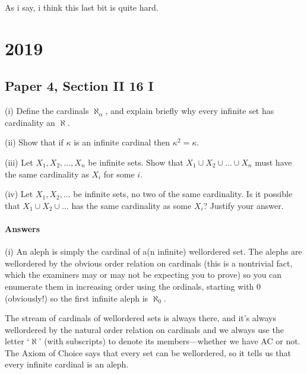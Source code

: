 \documentclass{book}
\begin{document}
\smallskip

As i say, i think this last bit is quite hard.


\chapter{2019}


\section*{Paper 4, Section II 16 I}

(i) Define the cardinals $\aleph_\alpha$, and explain briefly why every infinite
set has cardinality an $\aleph$.

\smallskip

\noindent (ii) Show that if $\kappa$ is an infinite cardinal then $\kappa^2=\kappa$.

\smallskip

\noindent (iii) Let $X_1, X_2,...,X_n$ be infinite sets. Show that $X_1\cup X_2\cup
\ldots \cup X_n$ must have the same cardinality as $X_i$ for some $i$.

\smallskip

\noindent (iv) Let $X_1,X_2,...$ be infinite sets, no two of the same cardinality. Is
it possible that $ X_1\cup X_2\cup...$ has the same cardinality as some
$X_i$? Justify your answer.

\subsubsection*{Answers}
(i) An aleph is simply the cardinal of a(n infinite) wellordered set.
The alephs are wellordered by the obvious order relation on cardinals
(this is a nontrivial fact, which the examiners may or may not be
expecting you to prove) so you can enumerate them in increasing order
using the ordinals, starting with 0 (obviously!) so the first infinite
aleph is $\aleph_0$.

The stream of cardinals of wellordered sets is always there, and it's
always wellordered by the natural order relation on cardinals and we
always use the letter `$\aleph$' (with subscripts) to denote its
members---whether we have AC or not.  The Axiom of Choice says that
every set can be wellordered, so it tells us that every infinite
cardinal is an aleph.

\smallskip
\end{document}
